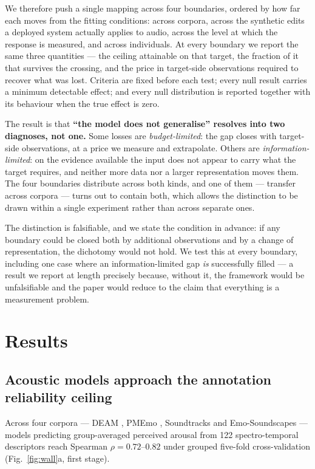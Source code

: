 We therefore push a single mapping across four boundaries, ordered by how far each
moves from the fitting conditions: across corpora, across the synthetic edits a
deployed system actually applies to audio, across the level at which the response is
measured, and across individuals. At every boundary we report the same three
quantities --- the ceiling attainable on that target, the fraction of it that
survives the crossing, and the price in target-side observations required to recover
what was lost. Criteria are fixed before each test; every null result carries a
minimum detectable effect; and every null distribution is reported together with its
behaviour when the true effect is zero.

The result is that \textbf{``the model does not generalise'' resolves into two
diagnoses, not one.} Some losses are \emph{budget-limited}: the gap closes with
target-side observations, at a price we measure and extrapolate. Others are
\emph{information-limited}: on the evidence available the input does not appear to
carry what the target requires, and
neither more data nor a larger representation moves them. The four boundaries
distribute across both kinds, and one of them --- transfer across corpora --- turns
out to contain both, which allows the distinction to be drawn within a single
experiment rather than across separate ones.

The distinction is falsifiable, and we state the condition in advance: if any
boundary could be closed both by additional observations and by a change of
representation, the dichotomy would not hold. We test this at every boundary,
including one case where an information-limited gap \emph{is} successfully filled ---
a result we report at length precisely because, without it, the framework would be
unfalsifiable and the paper would reduce to the claim that everything is a
measurement problem.

\section*{Results}

\subsection*{Acoustic models approach the annotation reliability ceiling}

Across four corpora --- DEAM \citep{aljanaki2017}, PMEmo \citep{zhang2018pmemo},
Soundtracks \citep{eerola2011} and Emo-Soundscapes \citep{fan2017emo} --- models
predicting group-averaged perceived arousal from 122 spectro-temporal descriptors
reach Spearman $\rho = 0.72$--$0.82$ under grouped five-fold cross-validation
(Fig.~\ref{fig:wall}a, first stage).

